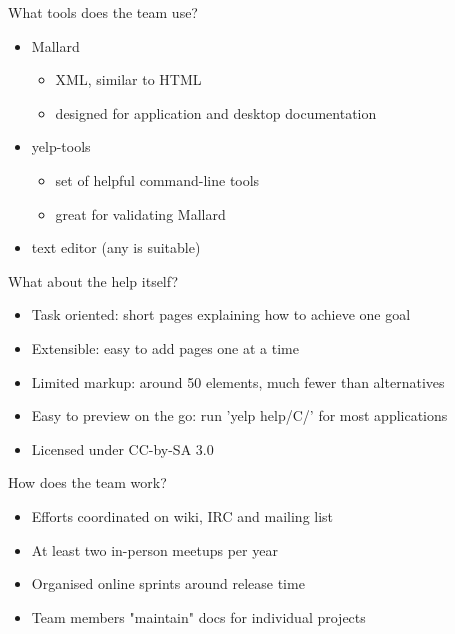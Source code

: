 \documentclass{beamer}
\begin{document}
\begin{frame}{What tools does the team use?}
  \begin{itemize}
  \item
    Mallard
    \begin{itemize}
      \item
        XML, similar to HTML
      \item
        designed for application and desktop documentation
    \end{itemize}
  \item
    yelp-tools
    \begin{itemize}
      \item
        set of helpful command-line tools
      \item
 	great for validating Mallard
    \end{itemize}
  \item
    text editor (any is suitable)
  \end{itemize}
\end{frame}

\begin{frame}{What about the help itself?}
  \begin{itemize}
  \item
    Task oriented: short pages explaining how to achieve one goal
  \item
    Extensible: easy to add pages one at a time
  \item
    Limited markup: around 50 elements, much fewer than alternatives
  \item
    Easy to preview on the go: run 'yelp help/C/' for most applications
  \item
    Licensed under CC-by-SA 3.0
  \end{itemize}
\end{frame}

\begin{frame}{How does the team work?}
  \begin{itemize}
  \item
    Efforts coordinated on wiki, IRC and mailing list
  \item
    At least two in-person meetups per year
  \item
    Organised online sprints around release time
  \item
    Team members "maintain" docs for individual projects
  \end{itemize}
\end{frame}
\end{document}
